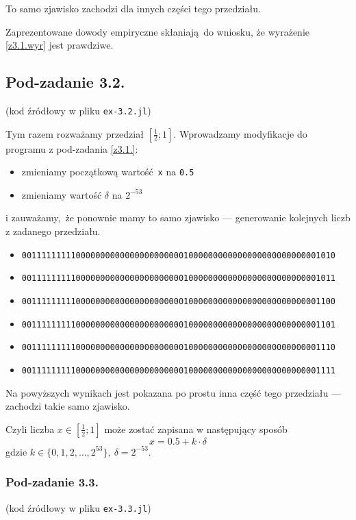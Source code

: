 \documentclass[10pt]{article}
\begin{document}
\noindent To samo zjawisko zachodzi dla innych części tego przedziału.

Zaprezentowane dowody empiryczne skłaniają do wniosku, że wyrażenie \ref*{z3.1.wyr} jest prawdziwe.

\subsection{Pod-zadanie 3.2.}
(kod źródłowy w pliku \texttt{ex-3.2.jl})

Tym razem rozważamy przedział $\left[ \frac{1}{2}; 1 \right]$. Wprowadzamy modyfikacje do programu z pod-zadania \ref*{z3.1.}:
\begin{itemize}
    \item zmieniamy początkową wartość \texttt{x} na \texttt{0.5}
    \item zmieniamy wartość $\delta$ na $2^{-53}$
\end{itemize}
i zauważamy, że ponownie mamy to samo zjawisko — generowanie kolejnych liczb z zadanego przedziału.

\begin{itemize}
    \item \texttt{0011111111100000000000000000000001000000000000000000000000001010}
    \item \texttt{0011111111100000000000000000000001000000000000000000000000001011}
    \item \texttt{0011111111100000000000000000000001000000000000000000000000001100}
    \item \texttt{0011111111100000000000000000000001000000000000000000000000001101}
    \item \texttt{0011111111100000000000000000000001000000000000000000000000001110}
    \item \texttt{0011111111100000000000000000000001000000000000000000000000001111}
\end{itemize}

Na powyższych wynikach jest pokazana po prostu inna część tego przedziału — zachodzi takie samo zjawisko.

Czyli liczba $x \in \left[ \frac{1}{2}; 1 \right]$ może zostać zapisana w następujący sposób
$$
x = 0.5 + k \cdot \delta
$$
gdzie $k \in \{ 0,1,2,\dots, 2^{53} \},~ \delta = 2^{-53}$.

\subsubsection{Pod-zadanie 3.3.}
(kod źródłowy w pliku \texttt{ex-3.3.jl})
\end{document}
